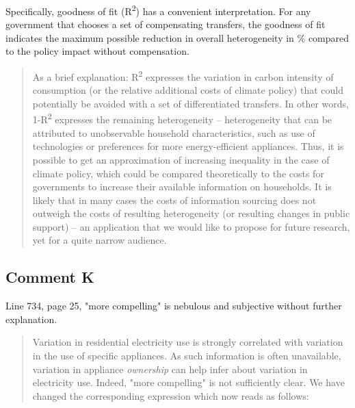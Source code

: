 \documentclass[11pt]{article}
\newenvironment{response}
{\begin{quote}\color{black}}
{\end{quote}}
\begin{document}
\begin{revisionbox}
    Specifically, goodness of fit (R\textsuperscript{2}) has a convenient interpretation. For any government that chooses a set of compensating transfers, the goodness of fit indicates the maximum possible reduction in overall heterogeneity in \% compared to the policy impact without compensation.
\end{revisionbox}

\begin{response}
    As a brief explanation: R\textsuperscript{2} expresses the variation in carbon intensity of consumption (or the relative additional costs of climate policy) that could potentially be avoided with a set of differentiated transfers. In other words, 1-R\textsuperscript{2} expresses the remaining heterogeneity -- heterogeneity that can be attributed to unobservable household characteristics, such as use of technologies or preferences for more energy-efficient appliances. Thus, it is possible to get an approximation of increasing inequality in the case of climate policy, which could be compared theoretically to the costs for governments to increase their available information on households. It is likely that in many cases the costs of information sourcing does not outweigh the costs of resulting heterogeneity (or resulting changes in public support) -- an application that we would like to propose for future research, yet for a quite narrow audience.
\end{response}    

\subsection*{Comment K}\label{comment_R1_K}

\begin{commentbox}
    Line 734, page 25, "more compelling" is nebulous and subjective without further explanation.
\end{commentbox}

\begin{response}
    Variation in residential electricity use is strongly correlated with variation in the use of specific appliances. As such information is often unavailable, variation in appliance \textit{ownership} can help infer about variation in electricity use. Indeed, "more compelling" is not sufficiently clear. We have changed the corresponding expression which now reads as follows:
\end{response}  
\end{document}
